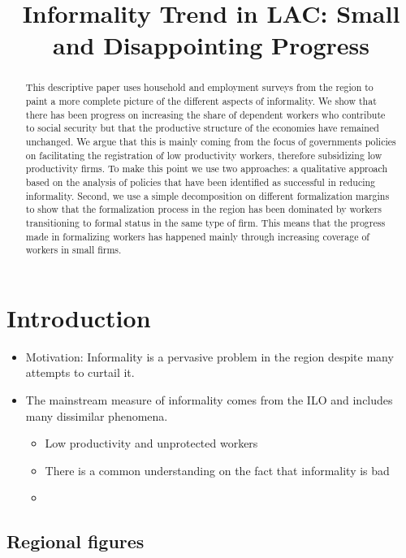 \documentclass[english]{article}
\begin{document}
\title{Informality Trend in LAC: Small and Disappointing Progress }
\maketitle
\begin{abstract}
    This descriptive paper uses household and employment surveys from the region to paint a more complete picture of the different aspects of informality. We show that there has been progress on increasing the share of dependent workers who contribute to social security but that the productive structure of the economies have remained unchanged. We argue that this is mainly coming from the focus of governments policies on facilitating the registration of low productivity workers, therefore subsidizing low productivity firms. To make this point we use two approaches: a qualitative approach based on the analysis of policies that have been identified as successful in reducing informality. Second, we use a simple decomposition on different formalization margins to show that the formalization process in the region has been dominated by workers transitioning to formal status in the same type of firm. This means that the progress made in formalizing workers has happened mainly through increasing coverage of workers in small firms. 
\end{abstract}
\section{Introduction}
\begin{itemize}
    \item Motivation: Informality is a pervasive problem in the region despite many attempts to curtail it. 
    \item The mainstream measure of informality comes from the ILO and includes many dissimilar phenomena. 
    \begin{itemize}
        \item Low productivity and unprotected workers
    \item There is a common understanding on the fact that informality is bad
    \item 
    \end{itemize}
\end{itemize}

\subsection{Regional figures}
\end{document}
